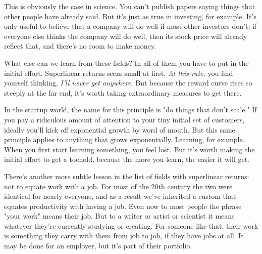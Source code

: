 This is obviously the case in science. You can't
                  publish papers saying things that other people have already
                  said. But it's just as true in investing, for example. It's
                  only useful to believe that a company will do well if most
                  other investors don't; if everyone else thinks the company
                  will do well, then its stock price will already reflect that,
                  and there's no room to make money.

What else can we
                  learn from these fields? In all of them you have to put in the
                  initial effort. Superlinear returns seem small at first.
                  \emph{At this rate,} you find yourself thinking,
                  \emph{I'll never get anywhere.} But because the reward curve
                  rises so steeply at the far end, it's worth taking
                  extraordinary measures to get there.

In the startup
                  world, the name for this principle is "do things that don't
                  scale." If you pay a ridiculous amount of attention to your
                  tiny initial set of customers, ideally you'll kick off
                  exponential growth by word of mouth. But this same principle
                  applies to anything that grows exponentially. Learning, for
                  example. When you first start learning something, you feel
                  lost. But it's worth making the initial effort to get a
                  toehold, because the more you learn, the easier it will
                  get.

There's another more subtle lesson in the list
                  of fields with superlinear returns: not to equate work with a
                  job. For most of the 20th century the two were identical for
                  nearly everyone, and as a result we've inherited a custom that
                  equates productivity with having a job. Even now to most
                  people the phrase "your work" means their job. But to a writer
                  or artist or scientist it means whatever they're currently
                  studying or creating. For someone like that, their work is
                  something they carry with them from job to job, if they have
                  jobs at all. It may be done for an employer, but it's part of
                  their portfolio.






